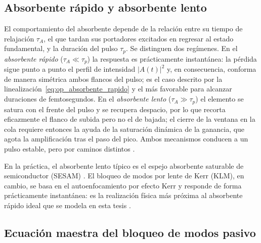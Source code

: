 \subsection{Absorbente rápido y absorbente lento}
\label{sec:absorbente_tipos}

El comportamiento del absorbente depende de la relación entre su tiempo de
relajación $\tau_A$, el que tardan sus portadores excitados en regresar al estado
fundamental, y la duración del pulso $\tau_p$. Se distinguen dos regímenes. En el
\emph{absorbente rápido} ($\tau_A \ll \tau_p$) la respuesta es prácticamente
instantánea: la pérdida sigue punto a punto el perfil de intensidad
$|A(t)|^2$ y, en consecuencia, conforma de manera simétrica ambos flancos del
pulso; es el caso descrito por la linealización~\eqref{eq:op_absorbente_rapido} y
el más favorable para alcanzar duraciones de femtosegundos. En el \emph{absorbente
lento} ($\tau_A \gg \tau_p$) el elemento se satura con el frente del pulso y se
recupera despacio, por lo que recorta eficazmente el flanco de subida pero no el de
bajada; el cierre de la ventana en la cola requiere entonces la ayuda de la
saturación dinámica de la ganancia, que agota la amplificación tras el paso del
pico. Ambos mecanismos conducen a un pulso estable, pero por caminos distintos
\cite[secs.~7.2.3 y 7.2.4]{Keller2022}.

En la práctica, el absorbente lento típico es el espejo absorbente saturable de
semiconductor (SESAM) \cite{Keller1996,Keller2003}. El bloqueo de modos por lente de
Kerr (KLM), en cambio, se basa en el autoenfocamiento por efecto Kerr y responde de
forma prácticamente instantánea: es la realización física más próxima al absorbente
rápido ideal que se modela en esta tesis \cite{Krausz1992,Keller2022}.

\subsection{Ecuación maestra del bloqueo de modos pasivo}
\label{sec:haus_pasivo}

